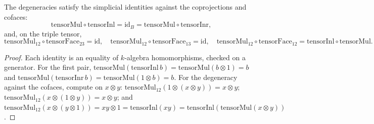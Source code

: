 \begin{lemma}
  \label{pa-lem:tensorMul_simplicial}
  \leanok

  The degeneracies satisfy the simplicial identities against the coprojections and cofaces:
  \[
    \mathrm{tensorMul} \circ \mathrm{tensorInl} = \mathrm{id}_B
      = \mathrm{tensorMul} \circ \mathrm{tensorInr} ,
  \]
  and, on the triple tensor,
  \[
    \mathrm{tensorMul}_{12} \circ \mathrm{tensorFace}_{23} = \mathrm{id}, \quad
    \mathrm{tensorMul}_{12} \circ \mathrm{tensorFace}_{13} = \mathrm{id}, \quad
    \mathrm{tensorMul}_{12} \circ \mathrm{tensorFace}_{12}
      = \mathrm{tensorInl} \circ \mathrm{tensorMul} .
  \]
\end{lemma}
\begin{proof}
  \leanok
  Each identity is an equality of \(k\)-algebra homomorphisms, checked on a generator. For the
  first pair, \(\mathrm{tensorMul}(\mathrm{tensorInl}\,b) = \mathrm{tensorMul}(b \otimes 1) = b\)
  and \(\mathrm{tensorMul}(\mathrm{tensorInr}\,b) = \mathrm{tensorMul}(1 \otimes b) = b\). For
  the degeneracy against the cofaces, compute on \(x \otimes y\): \(\mathrm{tensorMul}_{12}(1
  \otimes (x \otimes y)) = x \otimes y\); \(\mathrm{tensorMul}_{12}(x \otimes (1 \otimes y)) =
  x \otimes y\); and \(\mathrm{tensorMul}_{12}(x \otimes (y \otimes 1)) = xy \otimes 1 =
  \mathrm{tensorInl}(xy) = \mathrm{tensorInl}(\mathrm{tensorMul}(x \otimes y))\).
\end{proof}

